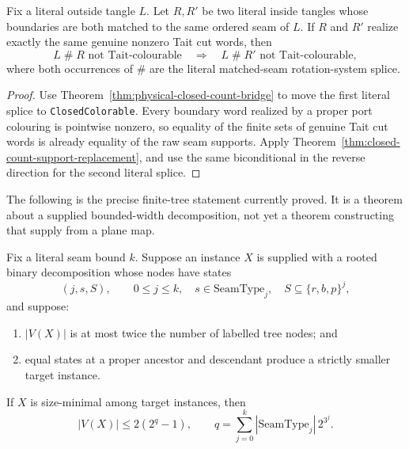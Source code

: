 \begin{corollary}
\label{cor:physical-closed-count-replacement}
Fix a literal outside tangle \(L\).  Let \(R,R'\) be two literal inside
tangles whose boundaries are both matched to the same ordered seam of \(L\).
If \(R\) and \(R'\) realize exactly the same genuine nonzero Tait cut words,
then
\[
 L\mathbin{\#}R\text{ not Tait-colourable}
 \quad\Longrightarrow\quad
 L\mathbin{\#}R'\text{ not Tait-colourable},
\]
where both occurrences of \(\#\) are the literal matched-seam rotation-system
splice.
\end{corollary}

\begin{proof}
Use Theorem~\ref{thm:physical-closed-count-bridge} to move the first literal
splice to \texttt{ClosedColorable}.  Every boundary word realized by a proper
port colouring is pointwise nonzero, so equality of the finite sets of genuine
Tait cut words is already equality of the raw seam supports.  Apply
Theorem~\ref{thm:closed-count-support-replacement}, and use the same
biconditional in the reverse direction for the second literal splice.
\end{proof}

The following is the precise finite-tree statement currently proved.  It is
a theorem about a supplied bounded-width decomposition, not yet a theorem
constructing that supply from a plane map.

\begin{theorem}
\label{thm:typed-sphere-cut-descent}
Fix a literal seam bound \(k\).  Suppose an instance \(X\) is supplied with a rooted binary
decomposition whose nodes have states
\[
  (j,s,S),\qquad 0\le j\le k,\quad
  s\in\mathrm{SeamType}_j,\quad
  S\subseteq\{r,b,p\}^{j},
\]
and suppose:
\begin{enumerate}
\item \(|V(X)|\) is at most twice the number of labelled tree nodes; and
\item equal states at a proper ancestor and descendant produce a strictly
smaller target instance.
\end{enumerate}
If \(X\) is size-minimal among target instances, then
\[
 |V(X)|\le 2(2^q-1),\qquad
 q=\sum_{j=0}^{k}|\mathrm{SeamType}_j|\,2^{3^j}.
\]
\end{theorem}

